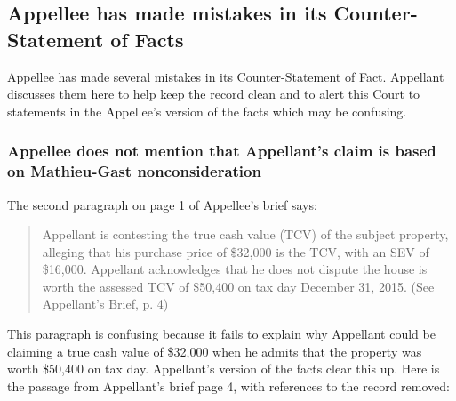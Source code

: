 \documentclass[12pt,\documentclassflag]{michiganCourtOfAppealsBrief}
\begin{document}



\subsection{Appellee has made mistakes in its Counter-Statement of Facts}

Appellee has made several mistakes in its Counter-Statement of Fact. Appellant discusses them here to help keep the record clean and to alert this Court to statements in the Appellee's version of the facts which may be confusing.

\subsubsection{Appellee does not mention that Appellant's claim is based on Mathieu-Gast nonconsideration}


The second paragraph on page 1 of Appellee's brief says:

\begin{quote}
Appellant is contesting the true cash value (TCV) of the subject property, alleging that his
purchase price of \$32,000 is the TCV, with an SEV of \$16,000. Appellant acknowledges that he
does not dispute the house is worth the assessed TCV of \$50,400 on tax day December 31, 2015. (See Appellant's Brief, p. 4)
\end{quote}

This paragraph is confusing because it fails to explain why Appellant could be claiming a true cash value of \$32,000 when he admits that the property was worth \$50,400 on tax day. Appellant's version of the facts clear this up. Here is the passage from Appellant's brief page 4, with references to the record removed:
\end{document}
